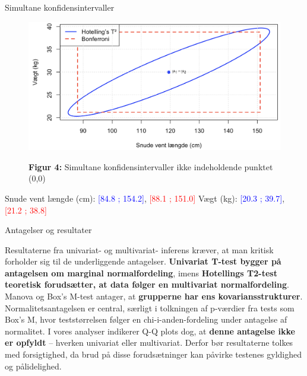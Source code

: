 \documentclass[final]{beamer}
\newlength{\colwidth}
\begin{document}
\begin{frame}[t]
\begin{columns}[t]
\begin{column}{\colwidth}
\vspace{-1.0em}  
\begin{block}{Simultane konfidensintervaller}
  \justifying
	\vspace{-0.5em}  
	\begin{figure}[h!]
		\centering
		\includegraphics[height=0.5\linewidth]{plots/simultan6.png}
  		
		\textbf{\textcolor{junglegreen}{Figur 4:}} Simultane konfidensintervaller ikke indeholdende punktet (0,0)
		
	\end{figure}

\begin{center}
Snude vent længde (cm): \textcolor{blue}{[84.8 ; 154.2]}, \textcolor{red}{[88.1 ; 151.0]} \quad
Vægt (kg): \textcolor{blue}{[20.3 ; 39.7]}, \textcolor{red}{[21.2 ; 38.8]}
\end{center}



  \end{block}
  
  
  

  \vspace{-1em}   
  \begin{block}{Antagelser og resultater}
  \justifying

Resultaterne fra univariat- og multivariat- inferens kræver, at man kritisk forholder sig til de underliggende antagelser. \textbf{Univariat T-test bygger på antagelsen om marginal normalfordeling}, imens \textbf{Hotellings T2-test teoretisk forudsætter, at data følger en multivariat normalfordeling}. Manova og Box’s M-test antager, at \textbf{grupperne har ens kovariansstrukturer}. Normalitetsantagelsen er central, særligt i tolkningen af p-værdier fra tests som Box’s M, hvor teststørrelsen følger en chi-i-anden-fordeling under antagelse af normalitet. I vores analyser indikerer Q-Q plots dog, at \textbf{denne antagelse ikke er opfyldt} – hverken univariat eller multivariat. Derfor bør resultaterne tolkes med forsigtighed, da brud på disse forudsætninger kan påvirke testenes gyldighed og pålidelighed.


\end{block}
\end{column}
\end{columns}
\end{frame}
\end{document}

